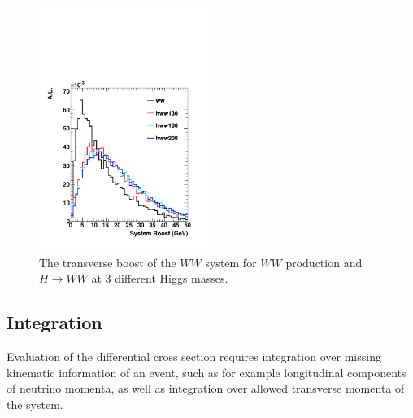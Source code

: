 \documentclass{cmspaper}
\begin{document}
\begin{figure}[!htbp]                                                                                         
\begin{center}                                                                                                
\includegraphics[width=0.5\textwidth]{figures/boost.pdf}                                                      
\caption{The transverse boost of the $WW$ system for $WW$ production and $H \rightarrow WW$ at 3 different Higgs masses.} 
\label{fig:wwboost}                                                                                           
\end{center}                                                                                                  
\end{figure}    

\subsection{Integration}
Evaluation of the differential cross section requires integration over missing kinematic information of an event, such 
as for example longitudinal components of neutrino momenta, as well as integration over allowed transverse momenta of the system.
\end{document}
